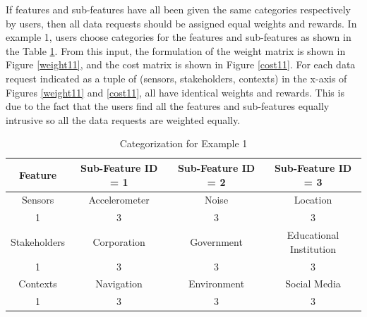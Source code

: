 If features and sub-features have all been given the same categories respectively by users, then all data requests should be assigned equal weights and rewards. In example 1, users choose categories for the features and sub-features as shown in the Table \ref{tab:scenario11}. From this input, the formulation of the weight matrix is shown in Figure \ref{weight11}, and the cost matrix is shown in Figure \ref{cost11}.
For each data request indicated as a tuple of (sensors, stakeholders, contexts) in the x-axis of Figures \ref{weight11} and \ref{cost11}, all have identical weights and rewards. This is due to the fact that the users find all the features and sub-features equally intrusive so all the data requests are weighted equally.

\begin{table}[h!]
  \centering
  \caption{Categorization for Example 1}
  \label{tab:scenario11}
  \begin{tabular}{cccc}
    \toprule
    Feature & Sub-Feature ID = 1 & Sub-Feature ID = 2 & Sub-Feature ID = 3\\
    \midrule
    Sensors & Accelerometer & Noise & Location\\
     1 & 3 & 3 & 3\\ \hhline{====}
     Stakeholders & Corporation & Government & Educational Institution\\
     1 & 3 & 3 & 3\\ \hhline{====}
     Contexts & Navigation & Environment & Social Media\\
     1 & 3 & 3 & 3\\ 
    \bottomrule
  \end{tabular}
\end{table}
 
